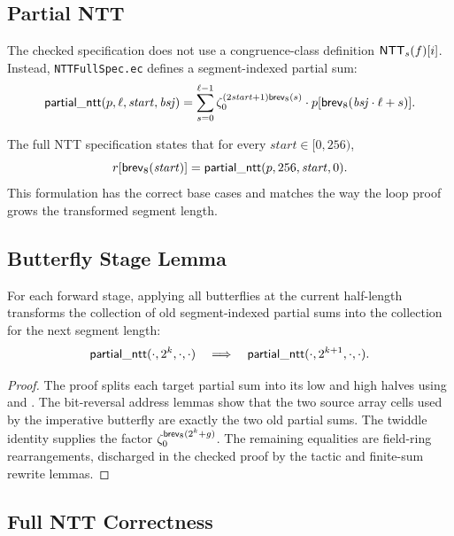 \subsection{Partial NTT}

\begin{definition}
  The checked specification does not use a congruence-class definition
  \(\mathsf{NTT}_s(f)[i]\).  Instead, \texttt{NTTFullSpec.ec} defines a
  segment-indexed partial sum:
  \[
    \mathsf{partial\_ntt}(p,\ell,\mathit{start},\mathit{bsj}) =
      \sum_{s=0}^{\ell-1}
        \zeta_0^{(2\mathit{start}+1)\mathsf{brev}_8(s)}
        \cdot p[\mathsf{brev}_8(\mathit{bsj}\cdot \ell+s)].
  \]
\label{def:partial_ntt}
\end{definition}

The full NTT specification states that for every
\(\mathit{start}\in[0,256)\),
\[
  r[\mathsf{brev}_8(\mathit{start})] =
    \mathsf{partial\_ntt}(p,256,\mathit{start},0).
\]
This formulation has the correct base cases and matches the way the loop
proof grows the transformed segment length.

\subsection{Butterfly Stage Lemma}

\begin{lemma}
  For each forward stage, applying all butterflies at the current half-length
  transforms the collection of old segment-indexed partial sums into the
  collection for the next segment length:
  \[
    \mathsf{partial\_ntt}(\cdot,2^k,\cdot,\cdot)
    \quad\Longrightarrow\quad
    \mathsf{partial\_ntt}(\cdot,2^{k+1},\cdot,\cdot).
  \]
\label{lem:butterfly_stage}
\end{lemma}

\begin{proof}
  The proof splits each target partial sum into its low and high halves using
   and .  The
  bit-reversal address lemmas show that the two source array cells used by
  the imperative butterfly are exactly the two old partial sums.  The
  twiddle identity  supplies the factor
  \(\zeta_0^{\mathsf{brev}_8(2^k+g)}\).  The remaining equalities are field-ring
  rearrangements, discharged in the checked proof by the  tactic
  and finite-sum rewrite lemmas.
\end{proof}

\subsection{Full NTT Correctness}

